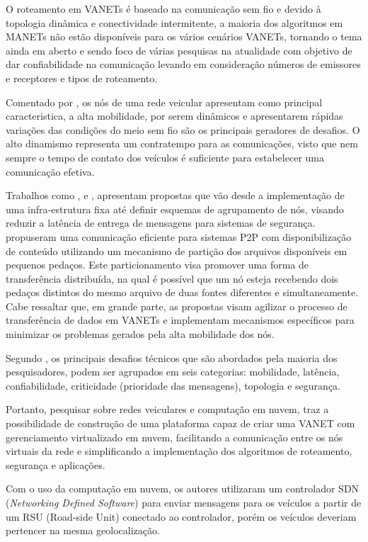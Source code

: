 \documentclass[
	12pt,				%
	oneside,			%
	a4paper,			%
	english,			%
	brazil				%
	]{abntex2ppgsi}
\begin{document}
O roteamento em VANETs é baseado na comunicação sem fio e devido à topologia dinâmica e conectividade intermitente, a maioria dos algoritmos em MANETs não estão disponíveis para os vários cenários VANETs, tornando o tema ainda em aberto  e sendo foco de várias pesquisas na atualidade com objetivo de dar confiabilidade na comunicação levando em consideração números de emissores e receptores e tipos de roteamento.

Comentado por , os nós de uma rede veicular apresentam como principal caracteristica, a alta mobilidade, por serem dinâmicos e apresentarem rápidas variações das condições do meio sem fio são os principais geradores de desafios.  O alto dinamismo representa um contratempo para as comunicações, visto que nem sempre o tempo de contato dos veículos é suficiente para estabelecer uma comunicação efetiva.

Trabalhos como  ,  e , apresentam propostas que vão desde a implementação de uma infra-estrutura fixa até definir esquemas de agrupamento de nós, visando reduzir a latência de entrega de mensagens para sistemas de segurança.  propuseram uma comunicação eficiente para sistemas P2P com disponibilização de conteúdo utilizando um mecanismo de partição dos arquivos disponíveis em pequenos pedaços.  Este particionamento visa promover uma forma de transferência distribuída,  na qual é possível que um nó esteja recebendo dois pedaços distintos do mesmo arquivo de duas fontes diferentes e simultaneamente.  Cabe ressaltar que, em grande parte, as propostas visam agilizar o processo de transferência de dados em VANETs e implementam mecanismos específicos para minimizar os problemas gerados pela alta mobilidade dos nós.

Segundo , os principais desafios técnicos que são abordados pela maioria dos pesquisadores, podem ser agrupados em seis categorias: mobilidade, latência, confiabilidade, criticidade (prioridade das mensagens), topologia e segurança. 

Portanto, pesquisar sobre redes veiculares e computação em nuvem, traz a possibilidade de construção de uma plataforma capaz de criar uma VANET com gerenciamento virtualizado em nuvem, facilitando a comunicação entre os nós virtuais da rede e simplificando a implementação dos algoritmos de roteamento, segurança e aplicações.

Com o uso da computação em nuvem, os autores   utilizaram um controlador SDN (\textit{Networking Defined Software}) para enviar mensagens para os veículos a partir de um RSU (Road-side Unit) conectado ao controlador, porém os veículos deveriam pertencer na mesma geolocalização.
\end{document}
